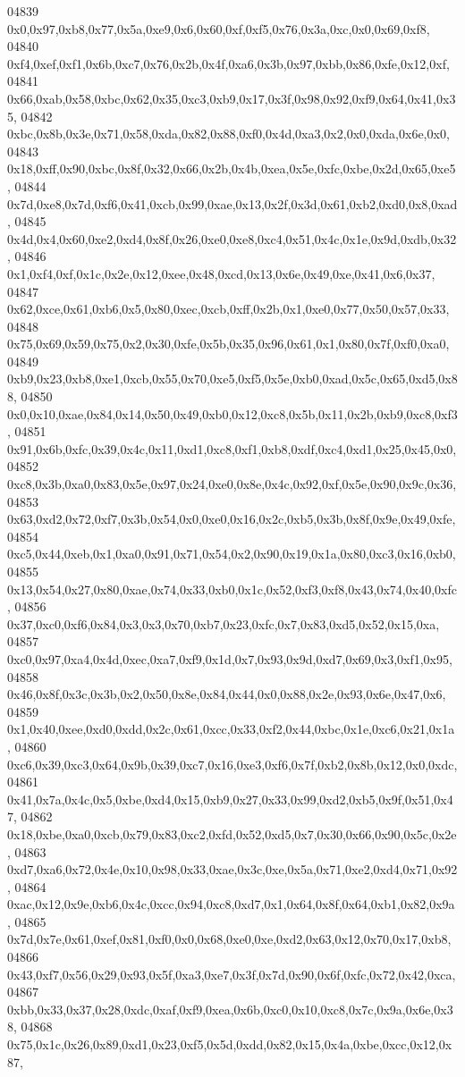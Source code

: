 \begin{DoxyCode}
04839   0x0,0x97,0xb8,0x77,0x5a,0xe9,0x6,0x60,0xf,0xf5,0x76,0x3a,0xc,0x0,0x69,0xf8,
04840   0xf4,0xef,0xf1,0x6b,0xc7,0x76,0x2b,0x4f,0xa6,0x3b,0x97,0xbb,0x86,0xfe,0x12,0xf,
04841   0x66,0xab,0x58,0xbc,0x62,0x35,0xc3,0xb9,0x17,0x3f,0x98,0x92,0xf9,0x64,0x41,0x35,
04842   0xbc,0x8b,0x3e,0x71,0x58,0xda,0x82,0x88,0xf0,0x4d,0xa3,0x2,0x0,0xda,0x6e,0x0,
04843   0x18,0xff,0x90,0xbc,0x8f,0x32,0x66,0x2b,0x4b,0xea,0x5e,0xfc,0xbe,0x2d,0x65,0xe5,
04844   0x7d,0xe8,0x7d,0xf6,0x41,0xcb,0x99,0xae,0x13,0x2f,0x3d,0x61,0xb2,0xd0,0x8,0xad,
04845   0x4d,0x4,0x60,0xe2,0xd4,0x8f,0x26,0xe0,0xe8,0xc4,0x51,0x4c,0x1e,0x9d,0xdb,0x32,
04846   0x1,0xf4,0xf,0x1c,0x2e,0x12,0xee,0x48,0xcd,0x13,0x6e,0x49,0xe,0x41,0x6,0x37,
04847   0x62,0xce,0x61,0xb6,0x5,0x80,0xec,0xcb,0xff,0x2b,0x1,0xe0,0x77,0x50,0x57,0x33,
04848   0x75,0x69,0x59,0x75,0x2,0x30,0xfe,0x5b,0x35,0x96,0x61,0x1,0x80,0x7f,0xf0,0xa0,
04849   0xb9,0x23,0xb8,0xe1,0xcb,0x55,0x70,0xe5,0xf5,0x5e,0xb0,0xad,0x5c,0x65,0xd5,0x88,
04850   0x0,0x10,0xae,0x84,0x14,0x50,0x49,0xb0,0x12,0xc8,0x5b,0x11,0x2b,0xb9,0xc8,0xf3,
04851   0x91,0x6b,0xfc,0x39,0x4c,0x11,0xd1,0xc8,0xf1,0xb8,0xdf,0xc4,0xd1,0x25,0x45,0x0,
04852   0xc8,0x3b,0xa0,0x83,0x5e,0x97,0x24,0xe0,0x8e,0x4c,0x92,0xf,0x5e,0x90,0x9c,0x36,
04853   0x63,0xd2,0x72,0xf7,0x3b,0x54,0x0,0xe0,0x16,0x2c,0xb5,0x3b,0x8f,0x9e,0x49,0xfe,
04854   0xc5,0x44,0xeb,0x1,0xa0,0x91,0x71,0x54,0x2,0x90,0x19,0x1a,0x80,0xc3,0x16,0xb0,
04855   0x13,0x54,0x27,0x80,0xae,0x74,0x33,0xb0,0x1c,0x52,0xf3,0xf8,0x43,0x74,0x40,0xfc,
04856   0x37,0xc0,0xf6,0x84,0x3,0x3,0x70,0xb7,0x23,0xfc,0x7,0x83,0xd5,0x52,0x15,0xa,
04857   0xc0,0x97,0xa4,0x4d,0xec,0xa7,0xf9,0x1d,0x7,0x93,0x9d,0xd7,0x69,0x3,0xf1,0x95,
04858   0x46,0x8f,0x3c,0x3b,0x2,0x50,0x8e,0x84,0x44,0x0,0x88,0x2e,0x93,0x6e,0x47,0x6,
04859   0x1,0x40,0xee,0xd0,0xdd,0x2c,0x61,0xcc,0x33,0xf2,0x44,0xbc,0x1e,0xc6,0x21,0x1a,
04860   0xc6,0x39,0xc3,0x64,0x9b,0x39,0xc7,0x16,0xe3,0xf6,0x7f,0xb2,0x8b,0x12,0x0,0xdc,
04861   0x41,0x7a,0x4c,0x5,0xbe,0xd4,0x15,0xb9,0x27,0x33,0x99,0xd2,0xb5,0x9f,0x51,0x47,
04862   0x18,0xbe,0xa0,0xcb,0x79,0x83,0xc2,0xfd,0x52,0xd5,0x7,0x30,0x66,0x90,0x5c,0x2e,
04863   0xd7,0xa6,0x72,0x4e,0x10,0x98,0x33,0xae,0x3c,0xe,0x5a,0x71,0xe2,0xd4,0x71,0x92,
04864   0xac,0x12,0x9e,0xb6,0x4c,0xcc,0x94,0xc8,0xd7,0x1,0x64,0x8f,0x64,0xb1,0x82,0x9a,
04865   0x7d,0x7e,0x61,0xef,0x81,0xf0,0x0,0x68,0xe0,0xe,0xd2,0x63,0x12,0x70,0x17,0xb8,
04866   0x43,0xf7,0x56,0x29,0x93,0x5f,0xa3,0xe7,0x3f,0x7d,0x90,0x6f,0xfc,0x72,0x42,0xca,
04867   0xbb,0x33,0x37,0x28,0xdc,0xaf,0xf9,0xea,0x6b,0xc0,0x10,0xc8,0x7c,0x9a,0x6e,0x38,
04868   0x75,0x1c,0x26,0x89,0xd1,0x23,0xf5,0x5d,0xdd,0x82,0x15,0x4a,0xbe,0xcc,0x12,0x87,

\end{DoxyCode}
